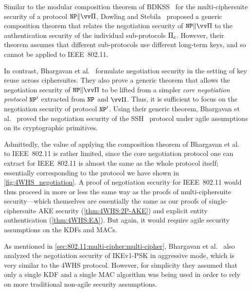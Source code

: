 Similar to the modular composition theorem of BDKSS~\cite{CCS:BDKSS14} for the multi-ciphersuite security of a protocol $\multiprotocol$,
Dowling and Stebila~\cite{ACISP:DowSte15} proposed a generic composition theorem that relates the negotiation security of $\multiprotocol$
to the authentication security of the individual sub-protocols $\mathrm{\Pi}_c$.
However,
their theorem assumes that different sub-protocols use different long-term keys,
and so cannot be applied to IEEE~802.11.

In contrast,
Bhargavan et al.~\cite{SP:BBFGKB16} formulate negotiation security in the setting of key reuse across ciphersuites.
They also prove a generic theorem that allows the negotiation security of $\multiprotocol$ to be lifted from a simpler \emph{core negotiation protocol} $\mathtt{NP}'$ extracted from $\mathtt{NP}$ and $\vprotocol$.
Thus,
it is sufficient to focus on the negotiation security of protocol $\mathtt{NP}'$.
Using their generic theorem,
Bhargavan et al.~\cite{SP:BBFGKB16} proved the negotiation security of the SSH~\cite{IETF:RFC4253:SSH_transport} protocol under agile assumptions on its cryptographic primitives.

Admittedly,
the value of applying the composition theorem of Bhargavan et al.~\cite{SP:BBFGKB16} to IEEE~802.11 is rather limited,
since the core negotiation protocol one can extract for IEEE~802.11 is almost the same as the whole protocol itself;
essentially corresponding to the protocol we have shown in \cref{fig:4WHS_negotiation}.
A proof of negotiation security for IEEE~802.11 would thus proceed in more or less the same way as the proofs of multi-ciphersuite security---which 
themselves are essentially the same as our proofs of single-ciphersuite AKE security (\cref{thm:4WHS:2P-AKE})
and explicit entity authentication (\cref{thm:4WHS:EA}).
But again,
it would require agile security assumptions on the KDFs and MACs.

 
As mentioned in \cref{sec:802.11:multi-cipher:multi-cipher},
Bhargavan et al.~\cite{SP:BBFGKB16} also analyzed the negotiation security of IKEv1-PSK in aggressive mode,
which is very similar to the 4WHS protocol.
However,
for simplicity they assumed that only a single KDF and a single MAC algorithm was being used in order to rely on more traditional non-agile security assumptions. 





